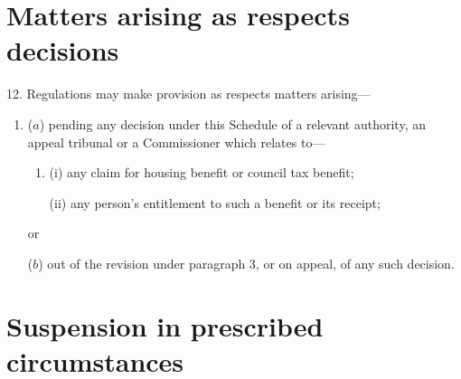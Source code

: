 \documentclass[12pt,a4paper]{article}
\begin{document}




%
\section*{Matters arising as respects decisions}

12. Regulations may make provision as respects matters arising—
\begin{enumerate}\item[]
($a$) pending any decision under this Schedule of a relevant authority, an appeal tribunal or a Commissioner which relates to—
\begin{enumerate}\item[]
(i) any claim for housing benefit or council tax benefit;

(ii) any person’s entitlement to such a benefit or its receipt;
\end{enumerate}
or

($b$) out of the revision under paragraph 3, or on appeal, of any such decision.
\end{enumerate}


\section*{Suspension in prescribed circumstances}
\end{document}

